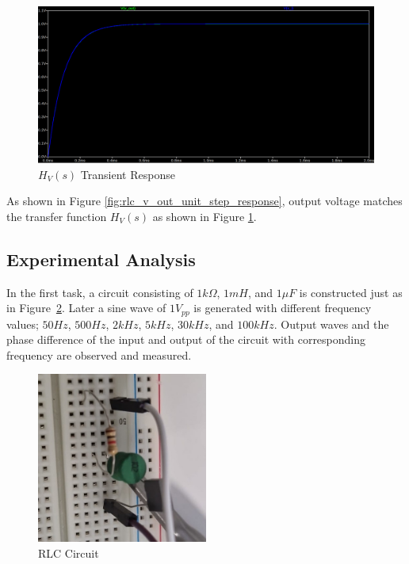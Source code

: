 \begin{figure}[h]
    \centering
    \includegraphics[width=1\textwidth]{assets/rlc-unit-step-sim-v-laplace.png}
    \caption{$H_{V}(s)$ Transient Response}
    \label{fig:rlc_v_laplace_unit_step_response}
\end{figure}

As shown in Figure \ref{fig:rlc_v_out_unit_step_response}, output voltage matches the transfer function $H_{V}(s)$ as shown in Figure \ref{fig:rlc_v_laplace_unit_step_response}.

\newpage
\thispagestyle{plain}

\subsection{Experimental Analysis}

In the first task, a circuit consisting of $1k\Omega$, $1mH$, and $1\mu F$ is constructed just as in Figure~\ref{fig:q1-circ}. Later a sine wave of $1V_{pp}$ is generated with different frequency values; $50Hz$, $500Hz$, $2kHz$, $5kHz$, $30kHz$, and $100kHz$. Output waves and the phase difference of the input and output of the circuit with corresponding frequency are observed and measured. 

\begin{figure}[h]
    \centering
    \includegraphics[width=0.5\textwidth]{assets/exp/q1-circ.jpeg}
    \caption{RLC Circuit}
    \label{fig:q1-circ}
\end{figure}

